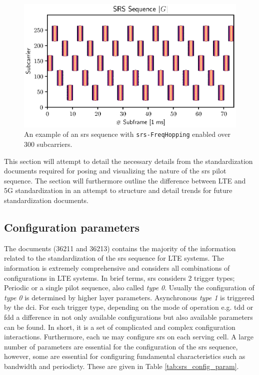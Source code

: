 \begin{figure}
    \centering
    \includegraphics{chapters/part_uplink/figures/srs_pilot_example.eps}
    \caption{An example of an \gls{srs} sequence with \texttt{srs-FreqHopping} enabled over $300$ subcarriers.}
    \label{fig:srs_pilot_example}
\end{figure}


This section will attempt to detail the necessary details from the standardization documents required for posing and visualizing the nature of the \gls{srs} pilot sequence. The section will furthermore outline the difference between LTE and 5G standardization in an attempt to structure and detail trends for future standardization documents. 

\subsection{Configuration parameters}
The documents \cite{36211,3GPP2020TS15} (36211 and 36213) contains the majority of the information related to the standardization of the \gls{srs} sequence for LTE systems. The information is extremely comprehensive and considers all combinations of configurations in LTE systems. In brief terms, \gls{srs} considers 2 trigger types; Periodic or a single pilot sequence, also called \emph{type 0}. Usually the configuration of \emph{type 0} is determined by higher layer parameters. Asynchronous \emph{type 1} is triggered by the \gls{dci}. For each trigger type, depending on the mode of operation e.g. \gls{tdd} or \gls{fdd} a difference in not only available configurations but also available parameters can be found. In short, it is a set of complicated and complex configuration interactions. Furthermore, each \gls{ue} may configure \gls{srs} on each serving cell. A large number of parameters are essential for the configuration of the \gls{srs} sequence, however, some are essential for configuring fundamental characteristics such as bandwidth and periodicty. These are given in Table \ref{tab:srs_config_param}.


